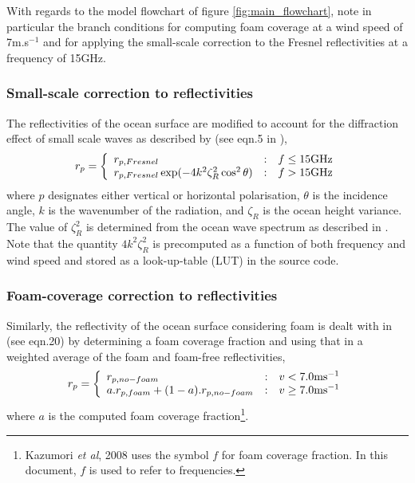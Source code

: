 With regards to the model flowchart of figure \ref{fig:main_flowchart}, note in particular the branch conditions for computing foam coverage at a wind speed of 7m.s$^{-1}$ and for applying the small-scale correction to the Fresnel reflectivities at a frequency of 15GHz.

\subsubsection{Small-scale correction to reflectivities}
\label{sec:small_scale_correction}
The reflectivities of the ocean surface are modified to account for the diffraction effect of small scale waves as described by \cite{GuissardSobieski1987} (see eqn.5 in \cite{Kazumori_etal_2008}),
\begin{equation}
  r_p = \left\{ \begin{array}{l@{\quad:\quad}l}
                  r_{p,Fresnel}                                 & f \le 15\textrm{GHz}\\
                  r_{p,Fresnel}\exp(-4k^2\zeta^2_R\cos^2\theta) & f > 15\textrm{GHz}
                \end{array} \right.
  \label{eqn:small_scale_correction}
\end{equation}
where $p$ designates either vertical or horizontal polarisation, $\theta$ is the incidence angle, $k$ is the wavenumber of the radiation, and $\zeta_R$ is the ocean height variance. The value of $\zeta^2_R$ is determined from the ocean wave spectrum as described in \cite{BjerkaasRiedel1979}. Note that the quantity $4k^2\zeta^2_R$ is precomputed as a function of both frequency and wind speed and stored as a look-up-table (LUT) in the source code.

\subsubsection{Foam-coverage correction to reflectivities}
\label{sec:foam_coverage_correction}
Similarly, the reflectivity of the ocean surface considering foam is dealt with in \cite{Kazumori_etal_2008} (see eqn.20) by determining a foam coverage fraction and using that in a weighted average of the foam and foam-free reflectivities,
\begin{equation}
  r_p = \left\{ \begin{array}{l@{\quad:\quad}l}
                  r_{p,no-foam}                      & v < \textrm{7.0ms}^{-1}\\
                  a.r_{p,foam} + (1-a).r_{p,no-foam} & v \ge \textrm{7.0ms}^{-1}
                \end{array} \right.
  \label{eqn:foam_coverage_correction}
\end{equation}
where $a$ is the computed foam coverage fraction\footnote{Kazumori \textit{et al}, 2008\cite{Kazumori_etal_2008} uses the symbol $f$ for foam coverage fraction. In this document, $f$ is used to refer to frequencies.}.


